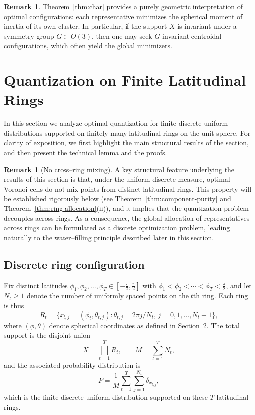 \documentclass[12pt, reqno]{amsart}
\theoremstyle{plain}
\theoremstyle{definition}
\newtheorem{remark}[subsection]{Remark}
\begin{document}
\begin{remark}
Theorem~\ref{thm:char} provides a purely geometric interpretation of optimal configurations: each representative minimizes the spherical
moment of inertia of its own cluster. In particular, if the support $ {X}$ is invariant under a symmetry group
$G \subset O(3)$, then one may seek $G$-invariant centroidal configurations, which often yield the global minimizers.
\end{remark} 




\section{Quantization on Finite Latitudinal Rings}\label{sec4}

In this section we analyze optimal quantization for finite discrete uniform distributions supported on finitely many latitudinal rings on the unit sphere.  
For clarity of exposition, we first highlight the main structural results of the section, and then present the technical lemma and the proofs.  


\begin{remark}[No cross--ring mixing]
A key structural feature underlying the results of this section is that, under the
uniform discrete measure, optimal Voronoi cells do not mix points from distinct
latitudinal rings.
This property will be established rigorously below (see Theorem~\ref{thm:component-purity} and
Theorem~\ref{thm:ring-allocation}(ii)), and it implies that the quantization problem decouples across
rings.
As a consequence, the global allocation of representatives across rings can be
formulated as a discrete optimization problem, leading naturally to the
water--filling principle described later in this section.
\end{remark}

\subsection{Discrete ring configuration}
Fix distinct latitudes $\phi_1, \phi_2, \ldots, \phi_T \in \left[-\frac{\pi}{2}, \frac{\pi}{2}\right]$ with
$\phi_1 < \phi_2 < \cdots < \phi_T < \frac{\pi}{2}$, and let $N_t \ge 1$ denote the number of uniformly spaced points on the $t$th ring.
Each ring is thus
\[
 {R}_t = \{ {x}_{t,j} = (\phi_t, \theta_{t,j}) : \theta_{t,j} = 2\pi j/N_t,\, j = 0, 1, \ldots, N_t - 1\},
\]
where $(\phi,\theta)$ denote spherical coordinates as defined in Section~2.
The total support is the disjoint union
\[
 {X} = \bigsqcup_{t=1}^T  {R}_t, \qquad M = \sum_{t=1}^T N_t,
\]
and the associated probability distribution is
\[
P = \frac{1}{M} \sum_{t=1}^T \sum_{j=1}^{N_t} \delta_{ {x}_{t,j}},
\]
which is the finite discrete uniform distribution supported on these $T$ latitudinal rings.
 
\end{document}
